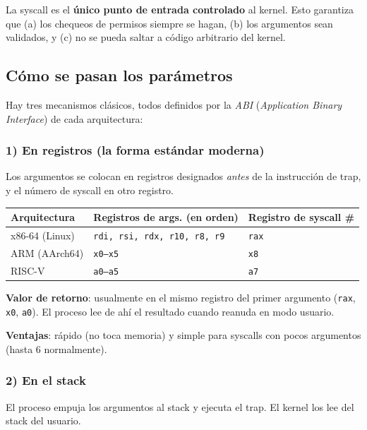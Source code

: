 \documentclass[11pt,a4paper]{article}
\begin{document}
La syscall es el \textbf{único punto de entrada controlado} al
kernel. Esto garantiza que (a) los chequeos de permisos siempre se
hagan, (b) los argumentos sean validados, y (c) no se pueda saltar a
código arbitrario del kernel.

\subsection*{Cómo se pasan los parámetros}

Hay tres mecanismos clásicos, todos definidos por la \emph{ABI}
(\emph{Application Binary Interface}) de cada arquitectura:

\subsubsection*{1) En registros (la forma estándar moderna)}

Los argumentos se colocan en registros designados \emph{antes} de la
instrucción de trap, y el número de syscall en otro registro.

\begin{center}
\small
\begin{tabular}{@{}lll@{}}
\toprule
Arquitectura & Registros de args. (en orden) & Registro de syscall \# \\
\midrule
x86-64 (Linux) & \texttt{rdi, rsi, rdx, r10, r8, r9}  & \texttt{rax} \\
ARM (AArch64)  & \texttt{x0--x5}                        & \texttt{x8}  \\
RISC-V         & \texttt{a0--a5}                        & \texttt{a7}  \\
\bottomrule
\end{tabular}
\end{center}

\textbf{Valor de retorno}: usualmente en el mismo registro del
primer argumento (\texttt{rax}, \texttt{x0}, \texttt{a0}). El
proceso lee de ahí el resultado cuando reanuda en modo usuario.

\textbf{Ventajas}: rápido (no toca memoria) y simple para syscalls
con pocos argumentos (hasta 6 normalmente).

\subsubsection*{2) En el stack}

El proceso empuja los argumentos al stack y ejecuta el trap. El
kernel los lee del stack del usuario.
\end{document}
